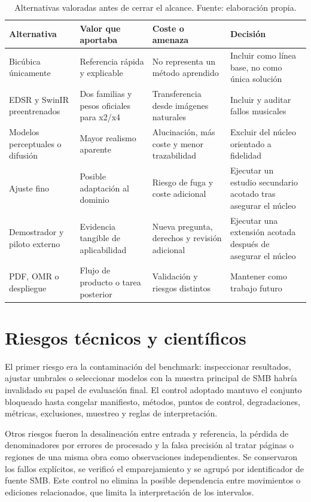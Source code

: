 \begin{table}[htbp]
  \centering
  \footnotesize
  \setlength{\tabcolsep}{3pt}
  \caption{Alternativas valoradas antes de cerrar el alcance. Fuente: elaboración propia.}
  \label{tab:alternatives}
  \begin{tabular}{p{}p{}p{}p{}}
    \toprule
    Alternativa & Valor que aportaba & Coste o amenaza & Decisión \\
    \midrule
    Bicúbica únicamente & Referencia rápida y explicable & No representa un método aprendido & Incluir como línea base, no como única solución \\
    EDSR y SwinIR preentrenados & Dos familias y pesos oficiales para x2/x4 & Transferencia desde imágenes naturales & Incluir y auditar fallos musicales \\
    Modelos perceptuales o difusión & Mayor realismo aparente & Alucinación, más coste y menor trazabilidad & Excluir del núcleo orientado a fidelidad \\
    Ajuste fino & Posible adaptación al dominio & Riesgo de fuga y coste adicional & Ejecutar un estudio secundario acotado tras asegurar el núcleo \\
    Demostrador y piloto externo & Evidencia tangible de aplicabilidad & Nueva pregunta, derechos y revisión adicional & Ejecutar una extensión acotada después de asegurar el núcleo \\
    PDF, OMR o despliegue & Flujo de producto o tarea posterior & Validación y riesgos distintos & Mantener como trabajo futuro \\
    \bottomrule
  \end{tabular}
\end{table}

\section{Riesgos técnicos y científicos}
El primer riesgo era la contaminación del benchmark: inspeccionar resultados, ajustar umbrales o
seleccionar modelos con la muestra principal de SMB habría invalidado su papel de evaluación final.
El control adoptado mantuvo
el conjunto bloqueado hasta congelar manifiesto, métodos, puntos de control, degradaciones,
métricas, exclusiones, muestreo y reglas de interpretación.

Otros riesgos fueron la desalineación entre entrada y referencia, la pérdida de denominadores por
errores de procesado y la falsa precisión al tratar páginas o regiones de una misma obra como
observaciones independientes. Se conservaron los fallos explícitos, se verificó el emparejamiento
y se agrupó por identificador de fuente SMB. Este control no elimina la posible dependencia entre
movimientos o ediciones relacionados, que limita la interpretación de los intervalos.

